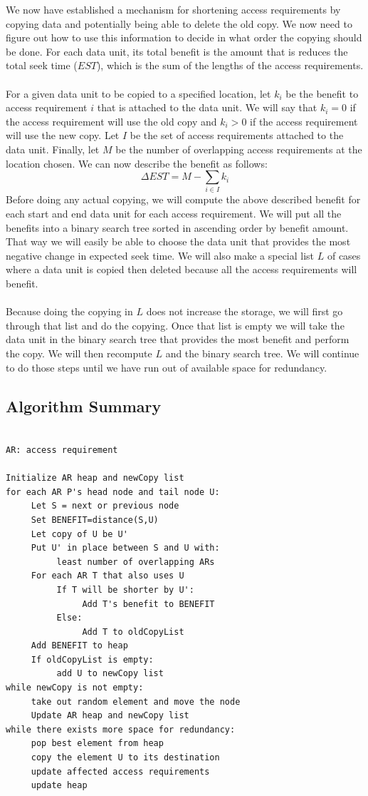 \documentclass[conference]{acmsiggraph}
\begin{document}
We now have established a mechanism for shortening access requirements by copying data and potentially being able to delete the old copy. We now need to figure out how to use this information to decide in what order the copying should be done. For each data unit, its total benefit is the amount that is reduces the total seek time ($EST$), which is the sum of the lengths of the access requirements. \\
\\
For a given data unit to be copied to a specified location, let $k_i$ be the benefit to access requirement $i$ that is attached to the data unit. We will say that $k_i=0$ if the access requirement will use the old copy and $k_i>0$ if the access requirement will use the new copy. Let $I$ be the set of access requirements attached to the data unit. Finally, let $M$ be the number of overlapping access requirements at the location chosen. We can now describe the benefit as follows:
\[
\Delta EST = M - \sum_{i \in I} k_i
\]
Before doing any actual copying, we will compute the above described benefit for each start and end data unit for each access requirement. We will put all the benefits into a binary search tree sorted in ascending order by benefit amount. That way we will easily be able to choose the data unit that provides the most negative change in expected seek time. We will also make a special list $L$ of cases where a data unit is copied then deleted because all the access requirements will benefit. \\
\\
Because doing the copying in $L$ does not increase the storage, we will first go through that list and do the copying. Once that list is empty we will take the data unit in the binary search tree that provides the most benefit and perform the copy. We will then recompute $L$ and the binary search tree. We will continue to do those steps until we have run out of available space for redundancy.  

\subsection{Algorithm Summary}

\begin{verbatim}

AR: access requirement

Initialize AR heap and newCopy list
for each AR P's head node and tail node U:
     Let S = next or previous node
     Set BENEFIT=distance(S,U)
     Let copy of U be U'
     Put U' in place between S and U with:
          least number of overlapping ARs
     For each AR T that also uses U
          If T will be shorter by U':
               Add T's benefit to BENEFIT
          Else:
               Add T to oldCopyList
     Add BENEFIT to heap
     If oldCopyList is empty:
          add U to newCopy list
while newCopy is not empty:
     take out random element and move the node
     Update AR heap and newCopy list
while there exists more space for redundancy:
     pop best element from heap
     copy the element U to its destination
     update affected access requirements
     update heap

\end{verbatim}
\end{document}
